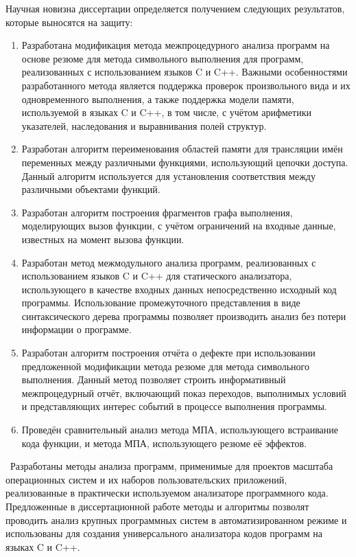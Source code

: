 {Научная новизна диссертации определяется получением следующих результатов, которые выносятся на защиту:
\begin{enumerate}
  \item Разработана модификация метода межпроцедурного анализа программ на основе резюме для метода символьного выполнения для программ, реализованных с использованием языков C и C++. Важными особенностями разработанного метода является поддержка проверок произвольного вида и их одновременного выполнения, а также поддержка модели памяти, используемой в языках C и C++, в том числе, с учётом арифметики указателей, наследования и выравнивания полей структур.
  \item Разработан алгоритм переименования областей памяти для трансляции имён переменных между различными функциями, использующий цепочки доступа. Данный алгоритм используется для установления соответствия между различными объектами функций.
  \item Разработан алгоритм построения фрагментов графа выполнения, моделирующих вызов функции, с учётом ограничений на входные данные, известных на момент вызова функции.
  \item Разработан метод межмодульного анализа программ, реализованных с использованием языков C и C++ для статического анализатора, использующего в качестве входных данных непосредственно исходный код программы. Использование промежуточного представления в виде синтаксического дерева программы позволяет производить анализ без потери информации о программе.
  \item Разработан алгоритм построения отчёта о дефекте при использовании предложенной модификации метода резюме для метода символьного выполнения. Данный метод позволяет строить информативный межпроцедурный отчёт, включающий показ переходов, выполнимых условий и представляющих интерес событий в процессе выполнения программы.
  \item Проведён сравнительный анализ метода МПА, использующего встраивание кода функции, и метода МПА, использующего резюме её эффектов. 

\end{enumerate}

\influence\ Разработаны методы анализа программ, применимые для проектов масштаба операционных систем и их наборов пользовательских приложений, реализованные в практически используемом анализаторе программного кода. Предложенные в диссертационной работе методы и алгоритмы позволят  проводить анализ крупных программных систем в автоматизированном режиме и использованы для создания универсального анализатора кодов программ на языках C и C++.

}
